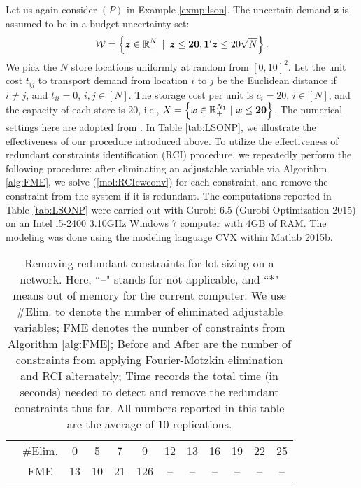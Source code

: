 \documentclass[fleqn,isre,blindrev]{informs4}
\newcommand{\mb}[1]{\mbox{\boldmath \ensuremath{#1}}}
\begin{document}
		\begin{example} \label{exp:rrc}
			Let us again consider $(P)$ in Example \ref{exmp:lson}. The uncertain demand $\boldsymbol{z}$ is assumed to be in a budget uncertainty set: 
\begin{equation}\label{set:bus}
				\mathcal{W}=\left\{ \boldsymbol{z} \in \mathbb{R}^{N}_+ \enskip| \enskip \boldsymbol{z} \le \boldsymbol{20}, \boldsymbol{1}'\boldsymbol{z} \le 20\sqrt{N} \right\}.
\end{equation}
			We pick the $N$ store locations uniformly at random from $[0,10]^2$. Let the unit cost $t_{ij}$ to transport demand from location $i$ to $j$ be the Euclidean distance if $i\ne j$, and $t_{ii}=0$, $i,j\in [N]$. The storage cost per unit is $c_i=20$, $i\in [N]$, and the capacity of each store is $20$, i.e., $X=\left\{ \mb{x} \in \mathbb{R}^{N_1}_+ \,\, |\,\,  \mb{x} \le \mb{20} \right\}$. The numerical settings here are adopted from \cite{bd16}. In Table \ref{tab:LSONP}, we illustrate the effectiveness of our procedure introduced above. To utilize the effectiveness of redundant constraints identification (RCI) procedure, we repeatedly perform the following procedure: after eliminating an adjustable variable via Algorithm \ref{alg:FME}, we solve (\ref{mol:RCIcwconv}) for each constraint, and remove the constraint from the system if it is redundant. The computations reported in Table \ref{tab:LSONP} were carried out with Gurobi 6.5 (Gurobi Optimization 2015) on an Intel i5-2400 3.10GHz Windows 7 computer with 4GB of RAM. The modeling was done using the modeling language CVX within Matlab 2015b.
\begin{table*}[t]
\centering
\caption{Removing redundant constraints for lot-sizing on a network. Here, ``--" stands for not applicable, and ``$*$" means out of memory for the current computer. We use \#Elim. to denote the number of eliminated adjustable variables; FME denotes the number of constraints from Algorithm \ref{alg:FME}; Before and After are the number of constraints from applying Fourier-Motzkin elimination and RCI alternately; Time records the total time (in seconds) needed to detect and remove the redundant constraints thus far. All numbers reported in this table are the average of 10 replications.}
\def\arraystretch{1.3}\begin{tabular}{rc|cccccccccc}
\cline{2-12}
& \#Elim. & 0     & 5     & 7     & 9     & 12    &  13     & 16    & 19    & 22    & 25 \\ \cline{2-12}
& FME   & 13    & 10    & 21  & 126 & --     & --      &  --      &  --      &  --      &  --  \\  

\end{tabular}
\end{table*}
\end{example}
\end{document}
